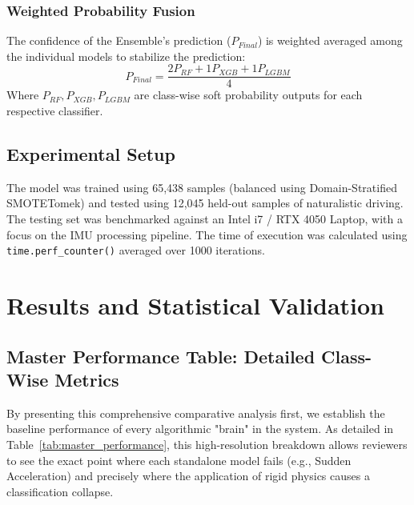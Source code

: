 \documentclass[pdflatex,sn-mathphys-num]{sn-jnl}
\theoremstyle{thmstyleone}
\theoremstyle{thmstyletwo}
\theoremstyle{thmstylethree}
\begin{document}
\FloatBarrier
\subsubsection{Weighted Probability Fusion}
The confidence of the Ensemble's prediction ($P_{Final}$) is weighted averaged among the individual models to stabilize the prediction:
\begin{equation}
P_{Final} = \frac{2P_{RF} + 1P_{XGB} + 1P_{LGBM}}{4}
\end{equation}
Where $P_{RF}, P_{XGB}, P_{LGBM}$ are class-wise soft probability outputs for each respective classifier.

\FloatBarrier
\subsection{Experimental Setup}\label{sec:experimental_setup}
The model was trained using 65,438 samples (balanced using Domain-Stratified SMOTETomek) and tested using 12,045 held-out samples of naturalistic driving. The testing set was benchmarked against an Intel i7 / RTX 4050 Laptop, with a focus on the IMU processing pipeline. The time of execution was calculated using \texttt{time.perf\_counter()} averaged over 1000 iterations.
\FloatBarrier
\FloatBarrier
\section{Results and Statistical Validation}\label{sec:results}

\subsection{Master Performance Table: Detailed Class-Wise Metrics}
By presenting this comprehensive comparative analysis first, we establish the baseline performance of every algorithmic "brain" in the system. As detailed in Table~\ref{tab:master_performance}, this high-resolution breakdown allows reviewers to see the exact point where each standalone model fails (e.g., Sudden Acceleration) and precisely where the application of rigid physics causes a classification collapse.
\end{document}
